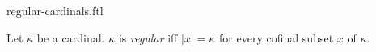 \documentclass{naproche-library}
\begin{document}
\begin{smodule}[title=Regular Cardinals]{regular-cardinals.ftl}

\begin{definition}[forthel,id=SET_THEORY_06_6532641205487950]
  Let $\kappa$ be a cardinal.
  $\kappa$ is \emph{regular} iff $|x| = \kappa$ for every cofinal subset $x$ of $\kappa$.
\end{definition}
\end{smodule}
\end{document}
